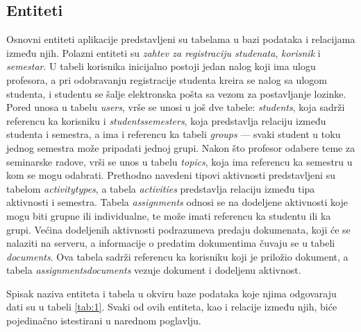 \documentclass[12pt,oneside]{memoir}
\begin{document}
\subsection{Entiteti}
\par Osnovni entiteti aplikacije predstavljeni su tabelama u bazi podataka i relacijama između njih.  Polazni entiteti su \emph{zahtev za registraciju studenata}, \emph{korisnik} i \emph{semestar}. U tabeli korisnika inicijalno postoji jedan nalog koji ima ulogu profesora, a pri odobravanju registracije studenta kreira se nalog sa ulogom studenta, i studentu se šalje elektronska pošta sa vezom za postavljanje lozinke. Pored unosa u tabelu \textit{users}, vrše se unosi u još dve tabele: \emph{students}, koja sadrži referencu ka korisniku i \emph{students{\textunderscore}semesters}, koja predstavlja relaciju između studenta i semestra, a ima i referencu ka tabeli \emph{groups} --- svaki student u toku jednog semestra može pripadati jednoj grupi. Nakon što profesor odabere teme za seminarske radove, vrši se unos u tabelu \emph{topics}, koja ima referencu ka semestru u kom se mogu odabrati. Prethodno navedeni tipovi aktivnosti predstavljeni su tabelom \emph{activity{\textunderscore}types}, a tabela \emph{activities} predstavlja relaciju između tipa aktivnosti i semestra. Tabela \emph{assignments} odnosi se na dodeljene aktivnosti koje mogu biti grupne ili individualne, te može imati referencu ka studentu ili ka grupi. Većina dodeljenih aktivnosti podrazumeva predaju dokumenata, koji će se nalaziti na serveru, a informacije o predatim dokumentima čuvaju se u tabeli \emph{documents}. Ova tabela sadrži referencu ka korisniku koji je priložio dokument, a tabela \emph{assignments{\textunderscore}documents} vezuje dokument i dodeljenu aktivnost.
\par Spisak naziva entiteta i tabela u okviru baze podataka koje njima odgovaraju dati su u tabeli \ref{tab:1}. Svaki od ovih entiteta, kao i relacije između njih, biće pojedinačno istestirani u narednom poglavlju.
\end{document}
